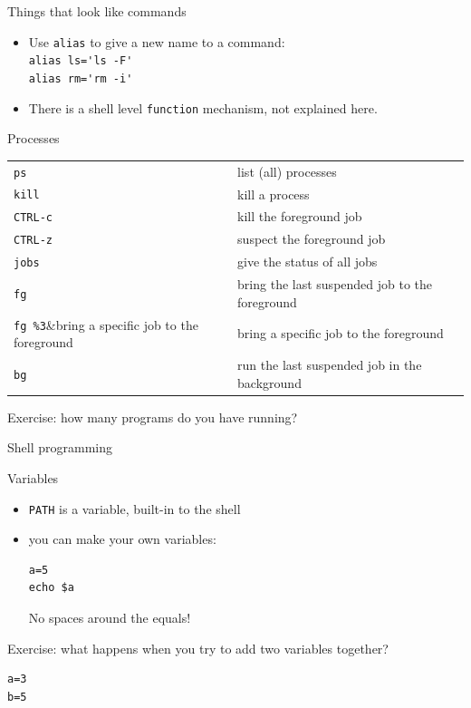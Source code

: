 \documentclass[11pt,headernav]{beamer}
\begin{document}
\begin{numberedframe}{Things that look like commands}
  \label{sl-lnx:alias}
  \begin{itemize}
  \item Use \lstinline{alias} to give a new name to a command:\\
    \lstinline{alias ls='ls -F'}\\
    \lstinline{alias rm='rm -i'}
  \item There is a shell level \lstinline{function} mechanism,
    not explained here.
  \end{itemize}
\end{numberedframe}

\begin{numberedframe}{Processes}
  \label{sl-lnx:ps}
\begin{tabular}{ll}
  \toprule
  \lstinline{ps}&list (all) processes\\
  \lstinline{kill}&kill a process\\
  \verb+CTRL-c+&kill the foreground job\\
  \verb+CTRL-z+&suspect the foreground job\\
  \lstinline{jobs}&give the status of all jobs\\
  \lstinline{fg}&bring the last suspended job to the foreground\\
  \verb+fg %3+&bring a specific job to the foreground\\
  \lstinline{bg}&run the last suspended job in the background\\
  \bottomrule
\end{tabular}

Exercise: how many programs do you have running?
\end{numberedframe}

 {Shell programming}

\begin{numberedframe}{Variables}
  \label{sl-lnx:var}
  \begin{itemize}
  \item \lstinline{PATH} is a variable, built-in to the shell
    \item you can make your own variables:
\begin{lstlisting}
a=5
echo $a
\end{lstlisting}
No spaces around the equals!
  \end{itemize}
Exercise: what happens when you try to add two variables together?
\begin{lstlisting}
a=3
b=5
\end{lstlisting}
\end{numberedframe}
\end{document}
